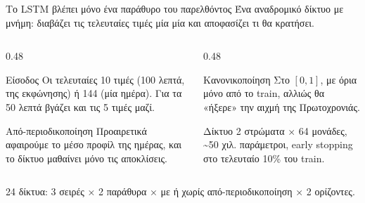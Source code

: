 \documentclass[aspectratio=169,10pt]{beamer}
\begin{document}
\begin{frame}{Το LSTM βλέπει μόνο ένα παράθυρο του παρελθόντος}
  Ένα αναδρομικό δίκτυο με \alert{μνήμη}: διαβάζει τις τελευταίες τιμές μία μία και αποφασίζει τι θα κρατήσει.
  \vspace{0.6em}

  \small
  \begin{columns}[T, onlytextwidth]
    \begin{column}{0.48\textwidth}
      \begin{block}{Είσοδος}
        Οι τελευταίες 10 τιμές (100 λεπτά, της εκφώνησης) ή 144 (μία ημέρα). Για τα 50 λεπτά βγάζει και τις 5 τιμές μαζί.
      \end{block}
      \begin{block}{Από-περιοδικοποίηση}
        Προαιρετικά αφαιρούμε το μέσο προφίλ της ημέρας, και το δίκτυο μαθαίνει μόνο τις αποκλίσεις.
      \end{block}
    \end{column}
    \begin{column}{0.48\textwidth}
      \begin{block}{Κανονικοποίηση}
        Στο $[0, 1]$, με όρια \alert{μόνο από το train}, αλλιώς θα «ήξερε» την αιχμή της Πρωτοχρονιάς.
      \end{block}
      \begin{block}{Δίκτυο}
        2 στρώματα × 64 μονάδες, \textasciitilde 50 χιλ. παράμετροι, early stopping στο τελευταίο 10\% του train.
      \end{block}
    \end{column}
  \end{columns}
  \vspace{0.4em}
  \normalsize\alert{24 δίκτυα}: 3 σειρές × 2 παράθυρα × με ή χωρίς από-περιοδικοποίηση × 2 ορίζοντες.
\end{frame}
\end{document}
